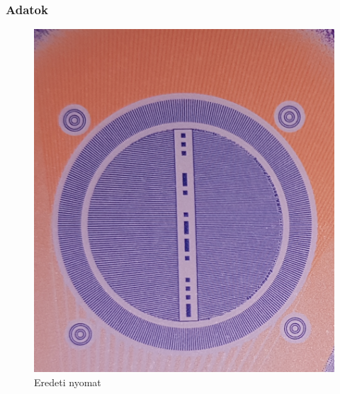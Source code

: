 \subsubsection{Adatok}


\begin{figure}[h]
	
	
	\begin{minipage}[c]{0.5\linewidth}
		\centering
		\includegraphics[width=\textwidth]{img/eredeti-pelda.png}
		\caption{Eredeti nyomat}
		\label{fig:eredeti.pelda}
		

\end{minipage}
\end{figure}
